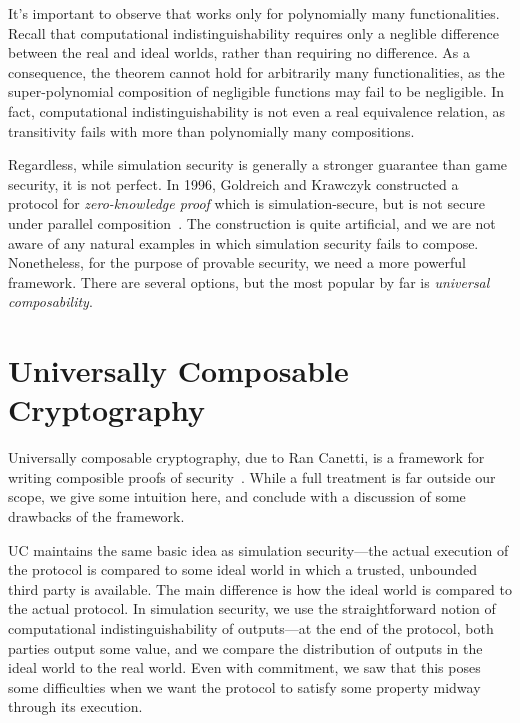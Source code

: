 It's important to observe that  works only for polynomially many functionalities. Recall that
computational indistinguishability requires only a neglible difference between
the real and ideal worlds, rather than requiring no difference. As a
consequence, the theorem cannot hold for arbitrarily many functionalities, as
the super-polynomial composition of negligible functions may fail to be
negligible. In fact, computational indistinguishability is not even a real
equivalence relation, as transitivity fails with more than polynomially many
compositions.

Regardless, while simulation security is generally a stronger guarantee than
game security, it is not perfect. In 1996, Goldreich and Krawczyk constructed a
protocol for \emph{zero-knowledge proof} which is simulation-secure, but is not
secure under parallel composition~\cite{goldreich-krawczyk-1996}. The
construction is quite artificial, and we are not aware of any natural examples
in which simulation security fails to compose. Nonetheless, for the purpose of
provable security, we need a more powerful framework. There are several options,
but the most popular by far is \emph{universal composability}.

\section{Universally Composable Cryptography}

Universally composable cryptography, due to Ran Canetti, is a framework for
writing composible proofs of security~\cite{canetti-2000}. While a full
treatment is far outside our scope, we give some intuition here, and conclude
with a discussion of some drawbacks of the framework.

UC maintains the same basic idea as simulation security---the actual execution
of the protocol is compared to some ideal world in which a trusted, unbounded
third party is available. The main difference is how the ideal world is compared
to the actual protocol. In simulation security, we use the straightforward
notion of computational indistinguishability of outputs---at the end of the
protocol, both parties output some value, and we compare the distribution of
outputs in the ideal world to the real world. Even with commitment, we saw that
this poses some difficulties when we want the protocol to satisfy some property
midway through its execution.

